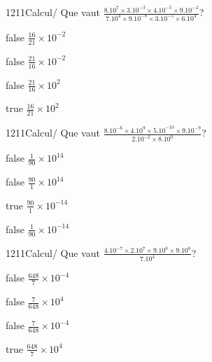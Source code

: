 \documentclass[11pt]{article}
\begin{document}
            \begin{question}{1211}{Calcul}{}{/}
                Que vaut $\frac{8.10^{7}\times 3.10^{-3}\times 4.10^{-5}\times 9.10^{-2}}{7.10^{4}\times 9.10^{-8}\times 3.10^{-5}\times 6.10^{4}}$?
            \end{question}
            
            \begin{reponses}
                \item[false] $\frac{16}{21}\times 10^{-2}$
                \item[false] $\frac{21}{16}\times 10^{-2}$
                \item[false] $\frac{21}{16}\times 10^{2}$
                \item[true] $\frac{16}{21}\times 10^{2}$
            \end{reponses}
            
            \begin{question}{1211}{Calcul}{}{/}
                Que vaut $\frac{8.10^{-6}\times 4.10^{9}\times 5.10^{-10}\times 9.10^{-9}}{2.10^{-2}\times 8.10^{0}}$?
            \end{question}
            
            \begin{reponses}
                \item[false] $\frac{1}{90}\times 10^{14}$
                \item[false] $\frac{90}{1}\times 10^{14}$
                \item[true] $\frac{90}{1}\times 10^{-14}$
                \item[false] $\frac{1}{90}\times 10^{-14}$
            \end{reponses}
            
            \begin{question}{1211}{Calcul}{}{/}
                Que vaut $\frac{4.10^{-7}\times 2.10^{7}\times 9.10^{8}\times 9.10^{0}}{7.10^{4}}$?
            \end{question}
            
            \begin{reponses}
                \item[false] $\frac{648}{7}\times 10^{-4}$
                \item[false] $\frac{7}{648}\times 10^{4}$
                \item[false] $\frac{7}{648}\times 10^{-4}$
                \item[true] $\frac{648}{7}\times 10^{4}$
            \end{reponses}
            
\end{document}
